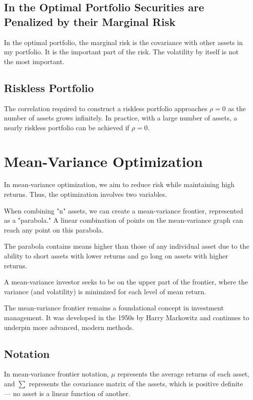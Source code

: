 \documentclass{article}
\begin{document}
\subsection{In the Optimal Portfolio Securities are Penalized by their Marginal Risk}
In the optimal portfolio, the marginal risk is the covariance with other assets in my portfolio. It is the important part of the risk. The volatility by itself is not the most important.

\subsection{Riskless Portfolio}
The correlation required to construct a riskless portfolio approaches ${\rho}=0$ as the number of assets grows infinitely. In practice, with a large number of assets, a nearly riskless portfolio can be achieved if ${\rho}=0$.

\section{Mean-Variance Optimization}
In mean-variance optimization, we aim to reduce risk while maintaining high returns. Thus, the optimization involves two variables.

When combining "n" assets, we can create a mean-variance frontier, represented as a "parabola."
A linear combination of points on the mean-variance graph can reach any point on this parabola.

The parabola contains means higher than those of any individual asset due to the ability to short assets with lower returns and go long on assets with higher returns.

A mean-variance investor seeks to be on the upper part of the frontier, where the variance (and volatility) is minimized for each level of mean return.

The mean-variance frontier remains a foundational concept in investment management. It was developed in the 1950s by Harry Markowitz and continues to underpin more advanced, modern methods.

\subsection{Notation}
In mean-variance frontier notation, ${\mu}$ represents the average returns of each asset, and ${\sum}$ represents the covariance matrix of the assets, which is positive definite — no asset is a linear function of another.
\end{document}
